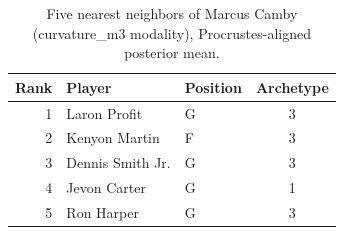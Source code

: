 \begin{table}[htbp]
  \centering\small
  \begin{tabular}{rllc}
    \toprule
    Rank & Player & Position & Archetype \\
    \midrule
    1 & Laron Profit & G & 3 \\
    2 & Kenyon Martin & F & 3 \\
    3 & Dennis Smith Jr. & G & 3 \\
    4 & Jevon Carter & G & 1 \\
    5 & Ron Harper & G & 3 \\
    \bottomrule
  \end{tabular}
  \caption{Five nearest neighbors of Marcus Camby (curvature_m3 modality), Procrustes-aligned posterior mean.}
  \label{tab:Marcus_Camby_neighbors_curvature_m3}
\end{table}

